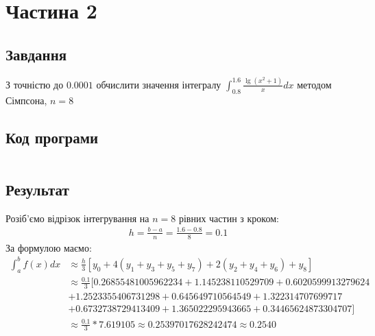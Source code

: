 \section{Частина 2}
\label{sec:task2}

\subsection{Завдання}
\label{subsec:task2_task}

З точністю до $0.0001$ обчислити значення інтегралу
$\int_{0.8}^{1.6} \frac{\lg (x^2 + 1)}{x} dx$
методом Сімпсона, $n = 8$

\subsection{Код програми}
\label{subsec:task2_code}
\inputminted{python}{../src/task2.py}

\subsection{Результат}
\label{subsec:task2_result}

Розіб'ємо відрізок інтегрування на $n = 8$ рівних частин з кроком:
\begin{align}
    h = \frac{b - a}{n} = \frac{1.6 - 0.8}{8} = 0.1
\end{align}
За формулою маємо:
\begin{align}
    \int_{a}^{b} f(x) dx
     & \approx \frac{h}{3} [
        y_0
        + 4(y_1 + y_3 + y_5 + y_7)
        + 2(y_2 + y_4 + y_6)
        + y_8
    ]                                   \\
     & \approx \frac{0.1}{3} [
        0.26855481005962234
        + 1.145238110529709
    + 0.6020599913279624                \\
     & + 1.2523355406731298
        + 0.645649710564549
    + 1.322314707699717                 \\
     & + 0.6732738729413409
        + 1.365022295943665
        + 0.34465624873304707
    ]                                   \\
     & \approx \frac{0.1}{3} * 7.619105
    \approx 0.25397017628242474
    \approx 0.2540
\end{align}
